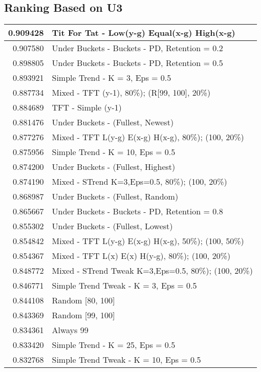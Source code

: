 \begin{table}[!hbtp]
\subsection{Ranking Based on U3}
\begin{footnotesize}
\begin{tabular}{|r|l|}\hline  \label{U3results}
0.909428 & Tit For Tat - Low(y-g) Equal(x-g) High(x-g)\\ \hline
0.907580 & Under Buckets - Buckets - PD, Retention = 0.2\\ \hline
0.898805 & Under Buckets - Buckets - PD, Retention = 0.5\\ \hline
0.893921 & Simple Trend - K = 3, Eps = 0.5\\ \hline
0.887734 & Mixed - {TFT (y-1), 80\%); (R[99, 100], 20\%)}\\ \hline
0.884689 & TFT - Simple (y-1)\\ \hline
0.881476 & Under Buckets - (Fullest, Newest)\\ \hline
0.877276 & Mixed - {TFT L(y-g) E(x-g) H(x-g), 80\%); (100, 20\%)}\\ \hline
0.875956 & Simple Trend - K = 10, Eps = 0.5\\ \hline
0.874200 & Under Buckets - (Fullest, Highest)\\ \hline
0.874190 & Mixed - {STrend K=3,Eps=0.5, 80\%); (100, 20\%)}\\ \hline
0.868987 & Under Buckets - (Fullest, Random)\\ \hline
0.865667 & Under Buckets - Buckets - PD, Retention = 0.8\\ \hline
0.855302 & Under Buckets - (Fullest, Lowest)\\ \hline
0.854842 & Mixed - {TFT L(y-g) E(x-g) H(x-g), 50\%); (100, 50\%)}\\ \hline
0.854367 & Mixed - {TFT L(x) E(x) H(y-g), 80\%); (100, 20\%)}\\ \hline
0.848772 & Mixed - {STrend Tweak K=3,Eps=0.5, 80\%); (100, 20\%)}\\ \hline
0.846771 & Simple Trend Tweak - K = 3, Eps = 0.5\\ \hline
0.844108 & Random [80, 100]\\ \hline
0.843369 & Random [99, 100]\\ \hline
0.834361 & Always 99\\ \hline
0.833420 & Simple Trend - K = 25, Eps = 0.5\\ \hline
0.832768 & Simple Trend Tweak - K = 10, Eps = 0.5\\ \hline

\end{tabular}
\end{footnotesize}
\end{table}
